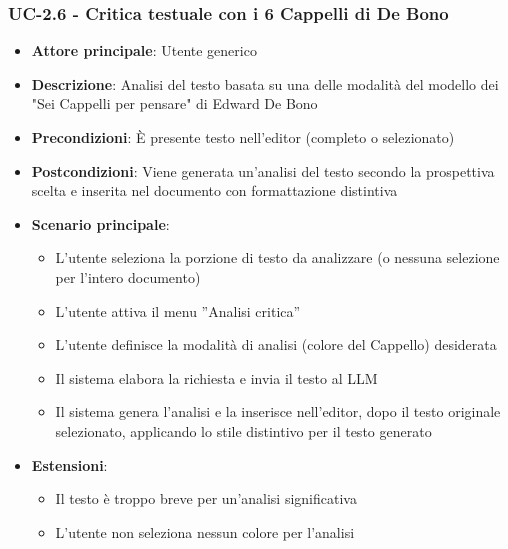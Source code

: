 \documentclass[11pt,a4paper]{article}
\begin{document}
\subsubsection{UC-2.6 - Critica testuale con i 6 Cappelli di De Bono}
\begin{itemize}
    \item \textbf{Attore principale}: Utente generico
    \item \textbf{Descrizione}: Analisi del testo basata su una delle modalità del modello dei "Sei Cappelli per pensare" di Edward De Bono
    \item \textbf{Precondizioni}: È presente testo nell’editor (completo o selezionato)
    \item \textbf{Postcondizioni}: Viene generata un’analisi del testo secondo la prospettiva scelta e inserita nel documento con formattazione distintiva
    \item \textbf{Scenario principale}:
    \begin{itemize}
        \item L’utente seleziona la porzione di testo da analizzare (o nessuna selezione per l'intero documento)
        \item L’utente attiva il menu ”Analisi critica”
        \item L’utente definisce la modalità di analisi (colore del Cappello) desiderata
        \item Il sistema elabora la richiesta e invia il testo al LLM
        \item Il sistema genera l'analisi e la inserisce nell'editor, dopo il testo originale selezionato, applicando lo stile distintivo per il testo generato
    \end{itemize}
    \item \textbf{Estensioni}:
    \begin{itemize}
        \item Il testo è troppo breve per un’analisi significativa
        \item L’utente non seleziona nessun colore per l’analisi
    \end{itemize}
\end{itemize}
\end{document}
